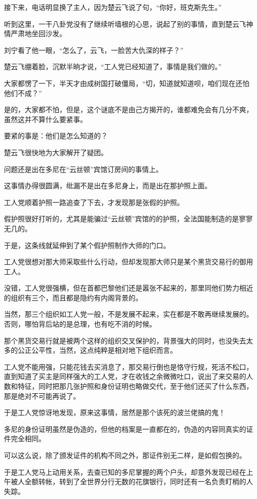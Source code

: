 接下来，电话明显换了主人，因为楚云飞说了句，“你好，班克斯先生。”

听到这里，一干八卦党没有了继续听墙根的心思，说起了别的事情，直到楚云飞神情严肃地坐回沙发。

刘宁看了他一眼，“怎么了，云飞，一脸苦大仇深的样子？”

楚云飞绷着脸，沉默半晌才说，“工人党已经知道了，事情是我们做的。”

大家都愣了一下，半天才由成树国打破僵局，“切，知道就知道呗，咱们现在还怕他们不成？”

是的，大家都不怕，但是，这个谜底不是由己方揭开的，谁都难免会有几分不爽，虽然这并不算什么要紧事。

要紧的事是：他们是怎么知道的？

楚云飞很快地为大家解开了疑团。

问题还是出在多尼在“云丝顿”宾馆订房间的事情上。

这事情办得很圆满，纰漏不是出在多尼身上，而是出在那护照上面。

工人党顺着护照一路追查了下去，才发现那是张假的护照。

假护照很好打听的，尤其是能骗过“云丝顿”宾馆的的护照，全法国能制造的是寥寥无几的。

于是，这条线就延伸到了某个假护照制作大师的门口。

工人党很想对那大师采取些什么行动，但却发现那大师只是某个黑货交易行的御用工人。

没错，工人党很强横，但在首都巴黎他们还是嚣张不起来的，那里同他们势力相近的组织有三个，而且都是隐约有内阁背景的。

当然，那三个组织如工人党一般，不是发展不起来，实在都是不敢再继续发展的。否则，哪怕背后站的是总理，也有吃不消的时候。

那个黑货交易行就是被两个这样的组织交叉保护的，背景强大的同时，也没失去太多的公正公平性，当然，这点纯粹是相对地下组织而言。

工人党不能用强，只能花钱去买消息了，那交易行倒也是恪守行规，死活不松口，直到知道了买主是同样强大的工人党，才在收钱之余微微吐口，说出了来交易的人数和特征，同时把那几张护照和身份证明也略做交代，至于他们还买了什么东西，那是绝对不可能再说了。

于是工人党惊讶地发现，原来这事情，居然是那个该死的波兰佬搞的鬼！

多尼的身份证明虽然是伪造的，但他的档案是一直都在的，伪造的内容同真实的证件完全相同。

可以这么说，除了颁发证件的机构不同之外，那证件别无二样，是如假包换的。

于是工人党马上动用关系，去查已知的多尼掌握的两个户头，却意外发现已经在上午被人全额转帐，转到了全世界分行无数的花旗银行，同时还有一名负责盯梢的人失踪。

